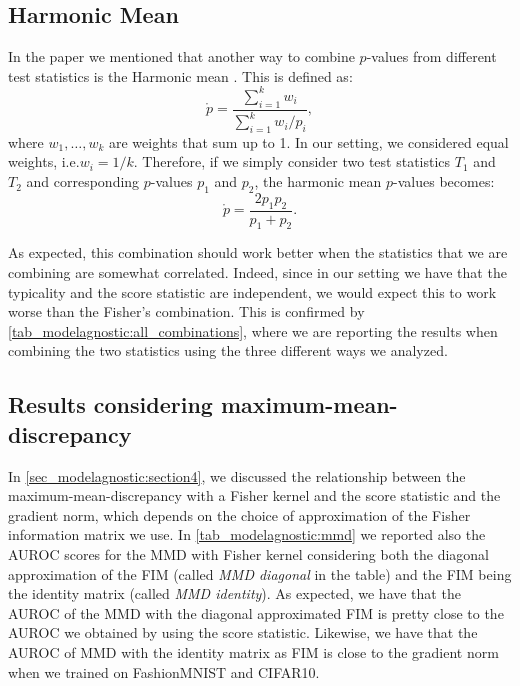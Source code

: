 {\subsection{Harmonic Mean}
\label{appendix_modelagnostic:harmonic}
In the paper we mentioned that another way to combine $p$-values from different test statistics is the Harmonic mean \citep{wilson_harmonic_2019}. This is defined as:
\begin{equation}
    \mathring{p} = \frac{\sum_{i=1}^{k} w_i}{\sum_{i=1}^{k} w_i / p_i},
\end{equation}
where $w_1,\dots,w_k$ are weights that sum up to 1. In our setting, we considered equal weights, i.e.\@ $w_i = 1 / k$. Therefore, if we simply consider two test statistics $T_1$ and $T_2$ and corresponding $p$-values $p_1$ and $p_2$, the harmonic mean $p$-values becomes:
\begin{equation}
    \mathring{p} = \frac{2 p_1 p_2}{p_1 + p_2}.
\end{equation}

As expected, this combination should work better when the statistics that we are combining are somewhat correlated. Indeed, since in our setting we have that the typicality and the score statistic are independent, we would expect this to work worse than the Fisher's combination. This is confirmed by \cref{tab_modelagnostic:all_combinations}, where we are reporting the results when combining the two statistics using the three different ways we analyzed.

\subsection{Results considering maximum-mean-discrepancy}
In \cref{sec_modelagnostic:section4}, we discussed the relationship between the maximum-mean-discrepancy with a Fisher kernel and the score statistic and the gradient norm, which depends on the choice of approximation of the Fisher information matrix we use. In \cref{tab_modelagnostic:mmd} we reported also the AUROC scores for the MMD with Fisher kernel considering both the diagonal approximation of the FIM (called \emph{MMD diagonal} in the table) and the FIM being the identity matrix (called \emph{MMD identity}). As expected, we have that the AUROC of the MMD with the diagonal approximated FIM is pretty close to the AUROC we obtained by using the score statistic. Likewise, we have that the AUROC of MMD with the identity matrix as FIM is close to the gradient norm when we trained on FashionMNIST and CIFAR10. 

}
